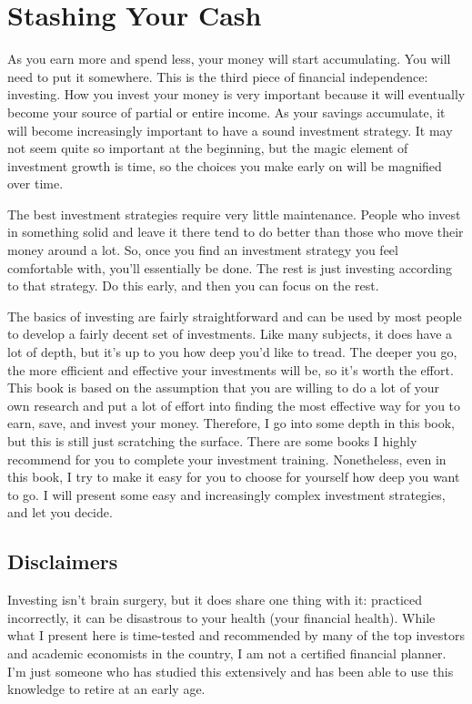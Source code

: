 
\chapter{Stashing Your Cash}
As you earn more and spend less, your money will start accumulating. You will need to put it somewhere. This is the third piece of financial independence: investing. How you invest your money is very important because it will eventually become your source of partial or entire income. As your savings accumulate, it will become increasingly important to have a sound investment strategy. It may not seem quite so important at the beginning, but the magic element of investment growth is time, so the choices you make early on will be magnified over time.

The best investment strategies require very little maintenance. People who invest in something solid and leave it there tend to do better than those who move their money around a lot. So, once you find an investment strategy you feel comfortable with, you'll essentially be done. The rest is just investing according to that strategy. Do this early, and then you can focus on the rest.

The basics of investing are fairly straightforward and can be used by most people to develop a fairly decent set of investments. Like many subjects, it does have a lot of depth, but it's up to you how deep you'd like to tread. The deeper you go, the more efficient and effective your investments will be, so it's worth the effort. This book is based on the assumption that you are willing to do a lot of your own research and put a lot of effort into finding the most effective way for you to earn, save, and invest your money. Therefore, I go into some depth in this book, but this is still just scratching the surface. There are some books I highly recommend for you to complete your investment training. Nonetheless, even in this book, I try to make it easy for you to choose for yourself how deep you want to go. I will present some easy and increasingly complex investment strategies, and let you decide.

\section{Disclaimers}
Investing isn't brain surgery, but it does share one thing with it: practiced incorrectly, it can be disastrous to your health (your financial health). While what I present here is time-tested and recommended by many of the top investors and academic economists in the country, I am not a certified financial planner. I'm just someone who has studied this extensively and has been able to use this knowledge to retire at an early age.

